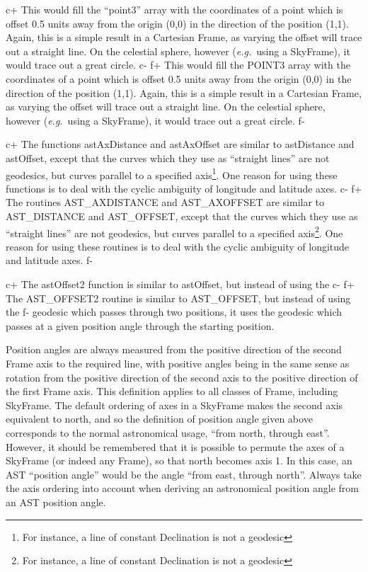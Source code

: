 \documentclass[twoside,11pt]{article}
\begin{document}
c+
This would fill the ``point3'' array with the coordinates of a point
which is offset 0.5 units away from the origin (0,0) in the direction
of the position (1,1). Again, this is a simple result in a Cartesian
Frame, as varying the offset will trace out a straight line. On the
celestial sphere, however ({\em{e.g.}}\ using a SkyFrame), it would
trace out a great circle.
c-
f+
This would fill the POINT3 array with the coordinates of a point which
is offset 0.5 units away from the origin (0,0) in the direction of the
position (1,1). Again, this is a simple result in a Cartesian Frame,
as varying the offset will trace out a straight line. On the celestial
sphere, however ({\em{e.g.}}\ using a SkyFrame), it would trace out a
great circle.
f-

c+
The functions astAxDistance and astAxOffset are similar to astDistance
and astOffset, except that the curves which they use as ``straight
lines'' are not geodesics, but curves parallel to a specified axis\footnote
{For instance, a line of constant Declination is not a geodesic}. One
reason for using these functions is to deal with the cyclic ambiguity of
longitude and latitude axes.
c-
f+
The routines AST\_AXDISTANCE and AST\_AXOFFSET are similar to AST\_DISTANCE
and AST\_OFFSET, except that the curves which they use as ``straight
lines'' are not geodesics, but curves parallel to a specified axis\footnote
{For instance, a line of constant Declination is not a geodesic}. One
reason for using these routines is to deal with the cyclic ambiguity of
longitude and latitude axes.
f-

c+
The astOffset2 function is similar to astOffset, but instead of using the
c-
f+
The AST\_OFFSET2 routine is similar to AST\_OFFSET, but instead of using the
f-
geodesic which passes through two positions, it uses the geodesic which
passes at a given position angle through the starting position.

Position angles are always measured from the positive direction of the
second Frame axis to the required line, with positive angles being in the
same sense as rotation from the positive direction of the second axis to
the positive direction of the first Frame axis. This definition applies
to all classes of Frame, including SkyFrame. The default ordering of axes
in a SkyFrame makes the second axis equivalent to north, and so the
definition of position angle given above corresponds to the normal
astronomical usage, ``from north, through east''. However, it should be
remembered that it is possible to permute the axes of a SkyFrame (or
indeed any Frame), so that north becomes axis 1. In this case, an AST
``position angle'' would be the angle ``from east, through north''.
Always take the axis ordering into account when deriving an astronomical
position angle from an AST position angle.
\end{document}
